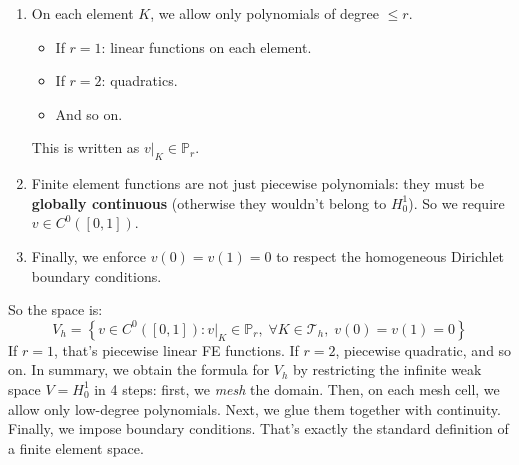 \begin{itemize}
\begin{deepeningbox}
\begin{enumerate}
            \item {} On each element $K$, we allow only polynomials of degree $\leq r$.
            \begin{itemize}
                \item If $r=1$: linear functions on each element.
                \item If $r=2$: quadratics.
                \item And so on.
            \end{itemize}
            This is written as $v|_{K} \in \mathbb{P}_{r}$.

            \item {} Finite element functions are not just piecewise polynomials: they must be \textbf{globally continuous} (otherwise they wouldn't belong to $H_{0}^{1}$). So we require $v \in C^{0}\left(\left[0,1\right]\right)$.

            \item {} Finally, we enforce $v(0)=v(1)=0$ to respect the homogeneous Dirichlet boundary conditions.
        \end{enumerate}
        So the space is:
        \begin{equation*}
            V_{h} = \left\{ v \in C^{0}\left(\left[0,1\right]\right) : v|_{K} \in \mathbb{P}_{r}, \; \forall K \in \mathcal{T}_{h}, \; v(0)=v(1)=0 \right\}
        \end{equation*}
        If $r=1$, that's piecewise linear FE functions. If $r=2$, piecewise quadratic, and so on. In summary, we obtain the formula for $V_{h}$ by restricting the infinite weak space $V = H_{0}^{1}$ in 4 steps: first, we \emph{mesh} the domain. Then, on each mesh cell, we allow only low-degree polynomials. Next, we glue them together with continuity. Finally, we impose boundary conditions. That's exactly the standard definition of a finite element space.
    \end{deepeningbox}
\end{itemize}
